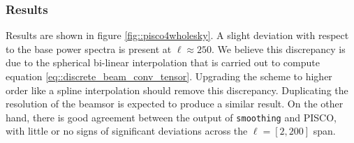 \documentclass[a4paper,11pt]{article}
\begin{document}
\subsubsection{Results}

Results are shown in figure \ref{fig::pisco4wholesky}. A slight deviation with respect to the base power spectra is present at $\ell \approx 250$. We believe this discrepancy is due to the spherical bi-linear interpolation that is carried out to compute equation \ref{eq::discrete_beam_conv_tensor}. Upgrading the scheme to higher order like a spline interpolation should remove this discrepancy. Duplicating the resolution of the beamsor is expected to produce a similar result. On the other hand, there is good agreement between the output of \texttt{smoothing} and PISCO, with little or no signs of significant deviations across the $\ell=[2,200]$ span.
\end{document}
